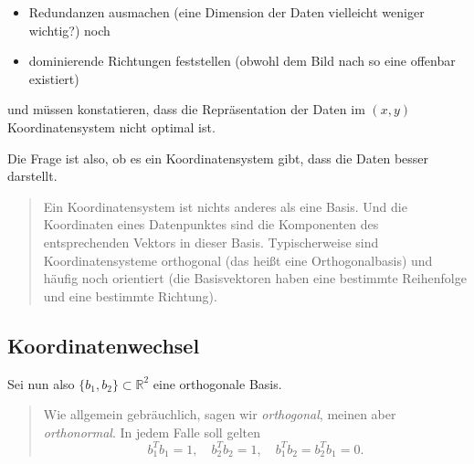\documentclass[
]{book}
\providecommand{\tightlist}{%
  \setlength{\itemsep}{0pt}\setlength{\parskip}{0pt}}
\newenvironment {JHSAYS} [0] {\begin{quote}\color{jhsc}} {\end{quote}}
\theoremstyle{definition}
\theoremstyle{definition}
\theoremstyle{definition}
\theoremstyle{definition}
\theoremstyle{remark}
\begin{document}
\begin{itemize}
\tightlist
\item
  Redundanzen ausmachen (eine Dimension der Daten vielleicht weniger wichtig?) noch
\item
  dominierende Richtungen feststellen (obwohl dem Bild nach so eine offenbar existiert)
\end{itemize}

und müssen konstatieren, dass die Repräsentation der Daten im \((x,y)\) Koordinatensystem nicht optimal ist.

Die Frage ist also, ob es ein Koordinatensystem gibt, dass die Daten besser darstellt.

\leavevmode\hypertarget{rem-coors}{}%
\begin{JHSAYS}
Ein Koordinatensystem ist nichts anderes als eine Basis. Und die Koordinaten eines Datenpunktes sind die Komponenten des entsprechenden Vektors in dieser Basis. Typischerweise sind Koordinatensysteme orthogonal (das heißt eine Orthogonalbasis) und häufig noch orientiert (die Basisvektoren haben eine bestimmte Reihenfolge und eine bestimmte Richtung).

\end{JHSAYS}

\hypertarget{koordinatenwechsel}{%
\subsection{Koordinatenwechsel}\label{koordinatenwechsel}}

Sei nun also \(\{b_1,b_2\}\subset \mathbb R^{2}\) eine orthogonale Basis.

\leavevmode\hypertarget{rem-ortho-bas}{}%
\begin{JHSAYS}
Wie allgemein gebräuchlich, sagen wir \emph{orthogonal}, meinen aber \emph{orthonormal}. In jedem Falle soll gelten
\begin{equation*}
b_1^T b_1=1, \quad b_2^Tb_2=1, \quad b_1^Tb_2 = b_2^Tb_1 = 0.
\end{equation*}

\end{JHSAYS}
\end{document}
